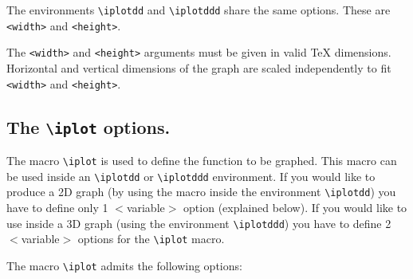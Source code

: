\documentclass[a4paper,12pt]{article}
\begin{document}
The environments \texttt{\textbackslash iplotdd} and \texttt{\textbackslash iplotddd} share the same options. These are \verb+<width>+ and \verb+<height>+.

The \verb+<width>+ and \verb+<height>+ arguments must be given in valid \TeX{} dimensions. Horizontal and vertical dimensions of the graph are scaled independently to fit \verb+<width>+ and \verb+<height>+.

\subsection{The \texttt{\textbackslash iplot} options.}
The macro \texttt{\textbackslash iplot} is used to define the function to be graphed. This macro can be used inside an \texttt{\textbackslash iplotdd} or \texttt{\textbackslash iplotddd} environment. If you would like to produce a 2D graph (by using the macro inside the environment \texttt{\textbackslash iplotdd}) you have to define only 1 $<$variable$>$ option (explained below). If you would like to use inside a 3D graph  (using the environment \texttt{\textbackslash iplotddd}) you have to define 2 $<$variable$>$ options for the \texttt{\textbackslash iplot} macro. 

The macro \texttt{\textbackslash iplot} admits the following options:
\end{document}

